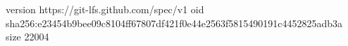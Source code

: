 version https://git-lfs.github.com/spec/v1
oid sha256:e23454b9bee09c8104ff67807df421f0e44e2563f5815490191c4452825adb3a
size 22004
